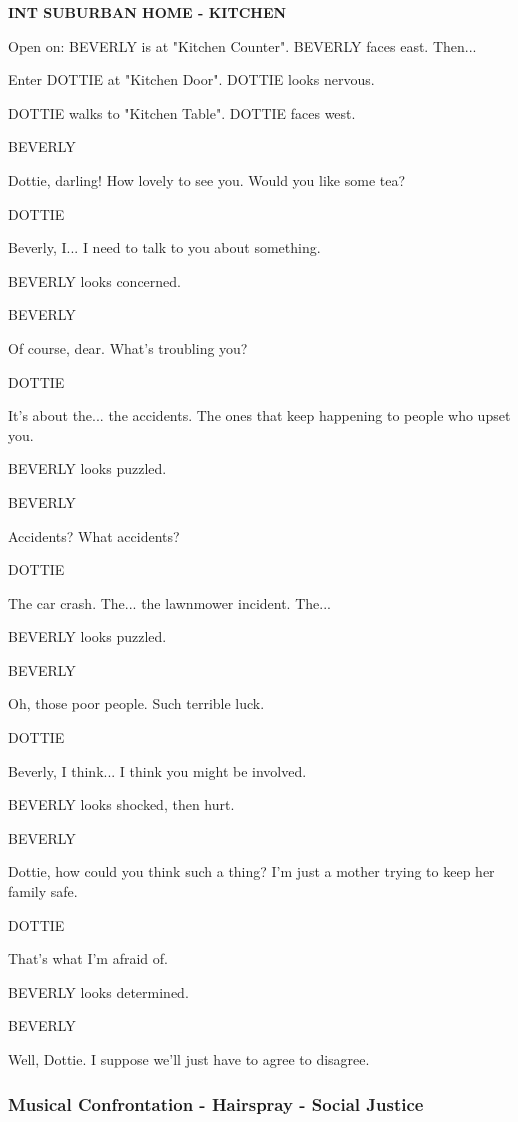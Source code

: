 \documentclass[11pt,letterpaper,oldstylefigures]{memoir}
\newcommand{\slugline}[1]{\nobreak\textbf{\MakeUppercase{#1}}\par\nobreak\vspace{1\baselineskip}}
\newcommand{\speaker}[1]{\nobreak\hspace*{0.333\textwidth}\MakeUppercase{#1}\par\nobreak\vspace{0.5\baselineskip}}
\newcommand{\dialogue}[1]{\nobreak\hspace*{0.25\textwidth}\begin{minipage}{0.5\textwidth}#1\end{minipage}\par\vspace{1\baselineskip}}
\newcommand{\stagedir}[1]{#1\par\vspace{1\baselineskip}}
\newenvironment{FountainExample}
  {\begingroup
  \ttfamily\small
   \setlength{\parindent}{0pt}
  \setlength{\parskip}{0.5em}
  \allowdisplaybreaks
  \setlength{\displaywidowpenalty}{0}
  \setlength{\widowpenalty}{0}
  \setlength{\clubpenalty}{0}
  \setlength{\interlinepenalty}{0}
}
  {\endgroup}
\begin{document}
\begin{FountainExample}
\slugline{INT SUBURBAN HOME - KITCHEN}

\stagedir{Open on: BEVERLY is at "Kitchen Counter". BEVERLY faces east. Then...}
\stagedir{Enter DOTTIE at "Kitchen Door". DOTTIE looks nervous.}
\stagedir{DOTTIE walks to "Kitchen Table". DOTTIE faces west.}

\speaker{BEVERLY}
\dialogue{Dottie, darling! How lovely to see you. Would you like some tea?}

\speaker{DOTTIE}
\dialogue{Beverly, I... I need to talk to you about something.}

\stagedir{BEVERLY looks concerned.}

\speaker{BEVERLY}
\dialogue{Of course, dear. What's troubling you?}

\speaker{DOTTIE}
\dialogue{It's about the... the accidents. The ones that keep happening to people who upset you.}

\stagedir{BEVERLY looks puzzled.}

\speaker{BEVERLY}
\dialogue{Accidents? What accidents?}

\speaker{DOTTIE}
\dialogue{The car crash. The... the lawnmower incident. The...}

\stagedir{BEVERLY looks puzzled.}

\speaker{BEVERLY}
\dialogue{Oh, those poor people. Such terrible luck.}

\speaker{DOTTIE}
\dialogue{Beverly, I think... I think you might be involved.}

\stagedir{BEVERLY looks shocked, then hurt.}

\speaker{BEVERLY}
\dialogue{Dottie, how could you think such a thing? I'm just a mother trying to keep her family safe.}

\speaker{DOTTIE}
\dialogue{That's what I'm afraid of.}

\stagedir{BEVERLY looks determined.}

\speaker{BEVERLY}
\dialogue{Well, Dottie. I suppose we'll just have to agree to disagree.}
\end{FountainExample}

\subsubsection*{Musical Confrontation - Hairspray - Social Justice}
\label{ex:musical-confrontation-hairspray}
\end{document}
